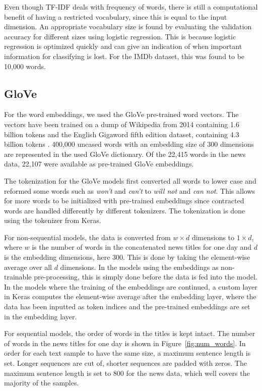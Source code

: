 Even though TF-IDF deals with frequency of words, there is still a computational benefit of having a restricted vocabulary, since this is equal to the input dimension. An appropriate vocabulary size is found by evaluating the validation accuracy for different sizes using logistic regression. This is because logistic regression is optimized quickly and can give an indication of when important information for classifying is lost. For the IMDb dataset, this was found to be 10,000 words. 

\subsection{GloVe}

For the word embeddings, we used the GloVe pre-trained word vectors. The vectors have been trained on a dump of Wikipedia from 2014 containing 1.6 billion tokens and the English Gigaword fifth edition dataset, containing 4.3 billion tokens \citep{pennington2014glove}. 400,000 uncased words with an embedding size of 300 dimensions are represented in the used GloVe dictionary. Of the 22,415 words in the news data, 22,107 were available as pre-trained GloVe embeddings. 

The tokenization for the GloVe models first converted all words to lower case and reformed some words such as \textit{won't} and \textit{can't} to \textit{will not} and \textit{can not}. This allows for more words to be initialized with pre-trained embeddings since contracted words are handled differently by different tokenizers. The tokenization is done using the tokenizer from Keras.  

For non-sequential models, the data is converted from $w \times d$ dimensions to $1 \times d$, where $w$ is the number of words in the concatenated news titles for one day and $d$ is the embedding dimensions, here 300. This is done by taking the element-wise average over all $d$ dimensions. In the models using the embeddings as non-trainable pre-processing, this is simply done before the data is fed into the model. In the models where the training of the embeddings are continued, a custom layer in Keras computes the element-wise average after the embedding layer, where the data has been inputted as token indices and the pre-trained embeddings are set in the embedding layer.

For sequential models, the order of words in the titles is kept intact. The number of words in the news titles for one day is shown in Figure~\ref{fig:num_words}. In order for each text sample to have the same size, a maximum sentence length is set. Longer sequences are cut of, shorter sequences are padded with zeros. The maximum sentence length is set to 800 for the news data, which well covers the majority of the samples. 


